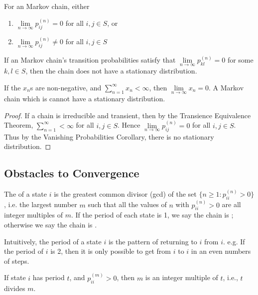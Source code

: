 \documentclass[11pt]{article}
\newcommand{\dur}[3]{{#1}_{#2}^{({#3})}}
\renewcommand{\limit}[1]{\underset{{#1} \rightarrow \infty}{\lim}}
\begin{document}
     For an  Markov chain, either
    \begin{enumerate}
    	\item $\limit{n} p_{ij}^{(n)} = 0$ for all $i, j \in S$, or
    	\item $\limit{n} p_{ij}^{(n)} \neq 0$ for all $i, j \in S$
    \end{enumerate}
    
	 If an  Markov chain's transition probabilities satisfy that $\limit{n} p_{kl}^{(n)} = 0$ for some $k, l 
	\in S$, then the chain does not have a stationary distribution.  
    
    \lemma If the $x_n$s are non-negative, and $\sum_{n=1}^\infty x_n < \infty$, then $\limit{n} x_n = 0$.
     A Markov chain which is  cannot have a stationary distribution.
    \begin{proof}
    	If a chain is irreducible and transient, then by the Transience Equivalence Theorem,
    	$\sum_{n=1}^\infty < \infty$ for all $i, j \in S$. Hence $\limit{n}\dur{p}{ij}{n} = 0$ for all $i, j \in S$. \\
    	Thus by the Vanishing Probabilities Corollary, there is no stationary distribution.
    	
    	
    	
    \end{proof}
    \subsection{Obstacles to Convergence}
     The  of a state $i$ is the greatest common divisor (gcd) of the set $\{n \geq 1: p_{ii}^{(n)} > 0\}$, i.e. the largest number $m$ such that all the values of $n$ with $p_{ii}^{(n)} > 0$ are all integer multiples of $m$. If the period of each state is 1, we say the chain is ; otherwise we say the chain is .
    
    \remark
    Intuitively, the period of a state $i$ is the pattern of returning to $i$ from $i$. e.g. If the period of $i$ is 2, then it is only possible to get from $i$ to $i$ in an even numbers of steps.
    
    \fact
    If state $i$ has period $t$, and $\dur{p}{ii}{m} > 0$, then $m$ is an integer multiple of $t$, i.e., $t$ divides $m$.
    
\end{document}
